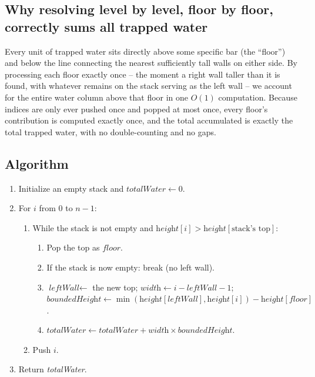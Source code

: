 \subsection*{Why resolving level by level, floor by floor, correctly sums all trapped water}

Every unit of trapped water sits directly above some specific bar (the
``floor'') and below the line connecting the nearest sufficiently tall
walls on either side. By processing each floor exactly once -- the moment
a right wall taller than it is found, with whatever remains on the stack
serving as the left wall -- we account for the entire water column above
that floor in one $O(1)$ computation. Because indices are only ever pushed
once and popped at most once, every floor's contribution is computed
exactly once, and the total accumulated is exactly the total trapped
water, with no double-counting and no gaps.

\subsection*{Algorithm}

\begin{enumerate}
  \item Initialize an empty stack and $\textit{totalWater} \gets 0$.
  \item For $i$ from $0$ to $n-1$:
  \begin{enumerate}
    \item While the stack is not empty and $\textit{height}[i] >
          \textit{height}[\text{stack's top}]$:
    \begin{enumerate}
      \item Pop the top as $\textit{floor}$.
      \item If the stack is now empty: break (no left wall).
      \item $\textit{leftWall} \gets$ the new top; $\textit{width}
            \gets i - \textit{leftWall} - 1$;
            $\textit{boundedHeight} \gets
            \min(\textit{height}[\textit{leftWall}],
            \textit{height}[i]) - \textit{height}[\textit{floor}]$.
      \item $\textit{totalWater} \gets \textit{totalWater} +
            \textit{width} \times \textit{boundedHeight}$.
    \end{enumerate}
    \item Push $i$.
  \end{enumerate}
  \item Return \textit{totalWater}.
\end{enumerate}

